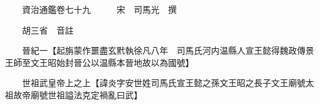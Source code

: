 










 


 
 


 

  
  
  
  
  





  
  
  
  
  
 
  

  

  
  
  



  

 
 

  
   




  

  
  


  　　資治通鑑卷七十九　　　宋　司馬光　撰

　　胡三省　音註

　　晉紀一【起旃蒙作噩盡玄黓執徐凡八年　司馬氏河内温縣人宣王懿得魏政傳景王師至文王昭始封晉公以温縣本晉地故以為國號】

　　世祖武皇帝上之上【諱炎字安世姓司馬氏宣王懿之孫文王昭之長子文王廟號太祖故帝廟號世祖謚法克定禍亂曰武】

